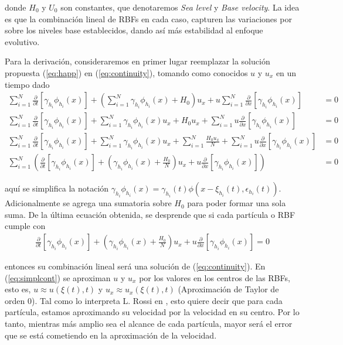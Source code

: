 \documentclass[spanish]{article} %
\providecommand{\DIFaddtex}[1]{{\protect\color{blue} \sf #1}} %
\providecommand{\DIFadd}[1]{\texorpdfstring{\DIFaddtex{#1}}{#1}} %
\begin{document}
     \DIFadd{donde $H_0$ y $U_0$ son constantes, que denotaremos \textit{Sea level} y \textit{Base velocity}. La idea es que la
     combinación lineal de RBFs en cada caso, capturen las variaciones por sobre los niveles base establecidos, dando así
     más estabilidad al enfoque evolutivo.
}

     \DIFadd{Para la derivación, consideraremos en primer lugar reemplazar la solución propuesta (\ref{eq:happ}) en (\ref{eq:continuity}), tomando como conocidos $u$ y $u_x$ en un tiempo dado
     }\begin{align*}
     \sum_{i=1}^{N} \frac{\partial}{\partial t}[\gamma_{h_i}\phi_{h_i}(x)] + \left(\sum_{i=1}^{N} \gamma_{h_i} \phi_{h_i}(x) + H_0\right) u_x + u \sum_{i=1}^N \frac{\partial}{\partial x}[\gamma_{h_i}\phi_{h_i}(x)] & = 0 \\
     \sum_{i=1}^{N} \frac{\partial}{\partial t}[\gamma_{h_i}\phi_{h_i}(x)] + \sum_{i=1}^{N} \gamma_{h_i} \phi_{h_i}(x)u_x + H_0 u_x +  \sum_{i=1}^N u \frac{\partial}{\partial x}[\gamma_{h_i}\phi_{h_i}(x)] & = 0 \\
     \sum_{i=1}^{N} \frac{\partial}{\partial t}[\gamma_{h_i}\phi_{h_i}(x)] + \sum_{i=1}^{N} \gamma_{h_i} \phi_{h_i}(x)u_x + \sum_{i=1}^{N} \frac{H_0 u_x}{N} +  \sum_{i=1}^N u \frac{\partial}{\partial x}[\gamma_{h_i}\phi_{h_i}(x)] & = 0 \\
     \sum_{i=1}^N \left(\frac{\partial}{\partial t}[\gamma_{h_i}\phi_{h_i}(x)] + \left(\gamma_{h_i} \phi_{h_i}(x) + \frac{H_0}{N}\right)u_x + u \frac{\partial}{\partial x}[\gamma_{h_i}\phi_{h_i}(x)]\right) & = 0
     \end{align*}

     \noindent \DIFadd{aquí se simplifica la notación $\displaystyle \gamma_{h_i}\phi_{h_i}(x) = \gamma_{h_i}(t)\phi(x-\xi_{h_i}(t),\epsilon_{h_i}(t))$. Adicionalmente se agrega una sumatoria sobre $H_0$ para poder formar una sola suma. De la última ecuación obtenida, se desprende que si cada partícula o RBF cumple con
     }\begin{align}
          \frac{\partial}{\partial t}[\gamma_{h_i}\phi_{h_i}(x)] + \left(\gamma_{h_i} \phi_{h_i}(x) + \frac{H_0}{N}\right)u_x + u \frac{\partial}{\partial x}[\gamma_{h_i}\phi_{h_i}(x)] = 0
          \label{eq:simplcont}
      \end{align}

      \noindent \DIFadd{entonces su combinación lineal será una solución de (\ref{eq:continuity}). En (\ref{eq:simplcont}) se aproximan $u$ y $u_x$ por los valores en los centros de las RBFs, esto es, $u \approx u(\xi(t),t)$ y $u_x \approx u_x(\xi(t),t)$ (Aproximación de Taylor de orden $0$). Tal como lo interpreta L. Rossi en \cite{rossi}, esto quiere decir que para cada partícula, estamos aproximando su velocidad por la velocidad en su centro. Por lo tanto, mientras más amplio sea el alcance de cada partícula, mayor será el error que se está cometiendo en la aproximación de la velocidad.
}
\end{document}
